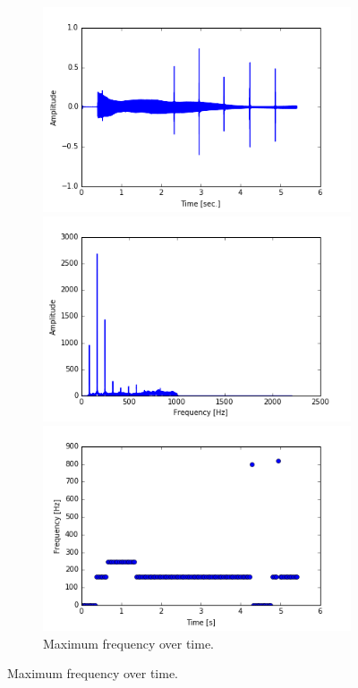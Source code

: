 \begin{figure}[H]
\begin{subfigure}{0.49\textwidth}
\end{subfigure}
\begin{subfigure}{0.49\textwidth}
\centering

\includegraphics[width=\textwidth]{figures/validation/integration/f_signal.png}
\caption{Filtered input signal with noise.}
\label{fig:inte_signal_filt}

\includegraphics[width=\textwidth]{figures/validation/integration/f_FSIGNAL.png}
\caption{Frequency spectrum of filtered signal.}
\label{fig:inte_SIGNAL_filt}

\includegraphics[width=\textwidth]{figures/validation/integration/peak_dec.png}
\caption{Maximum frequency over time.}
\label{fig:inte_peak}


\end{subfigure}
\end{figure}

